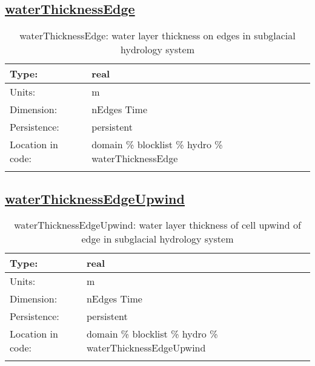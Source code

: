 \subsection[waterThicknessEdge]{\hyperref[sec:var_tab_hydro]{waterThicknessEdge}}
\label{subsec:var_sec_hydro_waterThicknessEdge}
\begin{center}
\begin{longtable}{| p{2.0in} | p{4.0in} |}
        \hline 
        Type: & real \\
        \hline 
        Units: & \si{m} \\
        \hline 
        Dimension: & nEdges Time \\
        \hline 
        Persistence: & persistent \\
        \hline 
         Location in code: & domain \% blocklist \% hydro \% waterThicknessEdge \\
         \hline 
    \caption{waterThicknessEdge: water layer thickness on edges in subglacial hydrology system}
\end{longtable}
\end{center}
\subsection[waterThicknessEdgeUpwind]{\hyperref[sec:var_tab_hydro]{waterThicknessEdgeUpwind}}
\label{subsec:var_sec_hydro_waterThicknessEdgeUpwind}
\begin{center}
\begin{longtable}{| p{2.0in} | p{4.0in} |}
        \hline 
        Type: & real \\
        \hline 
        Units: & \si{m} \\
        \hline 
        Dimension: & nEdges Time \\
        \hline 
        Persistence: & persistent \\
        \hline 
         Location in code: & domain \% blocklist \% hydro \% waterThicknessEdgeUpwind \\
         \hline 
    \caption{waterThicknessEdgeUpwind: water layer thickness of cell upwind of edge in subglacial hydrology system}
\end{longtable}
\end{center}

